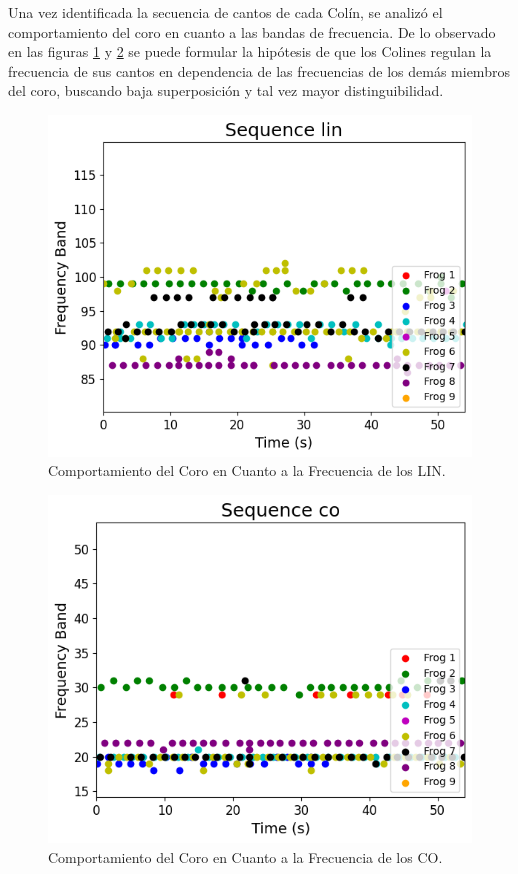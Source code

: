 \documentclass[a4paper,10pt,twocolumn]{article}
\begin{document}
Una vez identificada la secuencia de cantos de cada Colín, 
se analizó el comportamiento del coro en cuanto a las bandas de frecuencia.
De lo observado en las figuras \ref{fig:freqlin} y \ref{fig:freqco}
se puede formular la hipótesis de que los Colines regulan la frecuencia de sus
cantos en dependencia de las frecuencias de los demás miembros del coro,
buscando baja superposición y tal vez mayor distinguibilidad.



\begin{figure}[h!]
    \centering
    \includegraphics[width=\columnwidth]{assets/frequencylin.png}
    \caption{Comportamiento del Coro en Cuanto a la Frecuencia de los LIN.}
    \label{fig:freqlin}
\end{figure}

\begin{figure}[h!]
    \centering
    \includegraphics[width=\columnwidth]{assets/frequencyco.png}
    \caption{Comportamiento del Coro en Cuanto a la Frecuencia de los CO.}
    \label{fig:freqco}
\end{figure}
\end{document}
